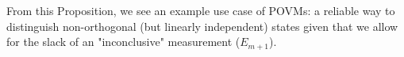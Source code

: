 \documentclass[main.tex]{subfiles}
\begin{document}
From this Proposition, we see an example use case of POVMs: a reliable way to distinguish non-orthogonal (but linearly independent) states given that we allow for the slack of an "inconclusive" measurement ($E_{m+1}$).

%
%
%
%
%
%
%
%
%
%
%
\end{document}
